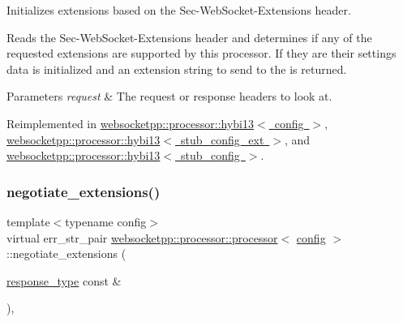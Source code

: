 Initializes extensions based on the Sec-\/\+Web\+Socket-\/\+Extensions header. 

Reads the Sec-\/\+Web\+Socket-\/\+Extensions header and determines if any of the requested extensions are supported by this processor. If they are their settings data is initialized and an extension string to send to the is returned.


\begin{DoxyParams}{Parameters}
{\em request} & The request or response headers to look at. \\
\hline
\end{DoxyParams}


Reimplemented in \mbox{\hyperlink{classwebsocketpp_1_1processor_1_1hybi13_aee995e6a4a29a800ce3b031885814ed1}{websocketpp\+::processor\+::hybi13$<$ config $>$}}, \mbox{\hyperlink{classwebsocketpp_1_1processor_1_1hybi13_aee995e6a4a29a800ce3b031885814ed1}{websocketpp\+::processor\+::hybi13$<$ stub\+\_\+config\+\_\+ext $>$}}, and \mbox{\hyperlink{classwebsocketpp_1_1processor_1_1hybi13_aee995e6a4a29a800ce3b031885814ed1}{websocketpp\+::processor\+::hybi13$<$ stub\+\_\+config $>$}}.

\mbox{\label{classwebsocketpp_1_1processor_1_1processor_a236ab7829e607fa58cc94c219a1a680c}} 
\subsubsection{\texorpdfstring{negotiate\+\_\+extensions()}{negotiate\_extensions()}\hspace{0.1cm}{\footnotesize\ttfamily [2/2]}}
{\footnotesize\ttfamily template$<$typename config$>$ \\
virtual err\+\_\+str\+\_\+pair \mbox{\hyperlink{classwebsocketpp_1_1processor_1_1processor}{websocketpp\+::processor\+::processor}}$<$ \mbox{\hyperlink{classconfig}{config}} $>$\+::negotiate\+\_\+extensions (\begin{DoxyParamCaption}\item[{\mbox{\hyperlink{classwebsocketpp_1_1http_1_1parser_1_1response}{response\+\_\+type}} const \&}]{ }\end{DoxyParamCaption})\hspace{0.3cm}{\ttfamily [inline]}, {\ttfamily [virtual]}}



